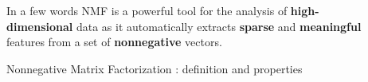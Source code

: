 \documentclass[final]{beamer}
\newlength{\sepwid}
\newlength{\onecolwid}
\newlength{\twocolwid}
\newlength{\threecolwid}
\begin{document}
\begin{frame}
\begin{columns}[t]
\begin{column}{\threecolwid}
\begin{columns}[t]
\begin{column}{\onecolwid}
\begin{exampleblock}{In a few words}
NMF is a powerful tool for the analysis of \textbf{high-dimensional} data as it automatically extracts \textbf{sparse} and \textbf{meaningful} features from a set of \textbf{nonnegative} vectors.
\end{exampleblock}


\begin{exampleblock}{Nonnegative Matrix Factorization : definition and properties}

\end{exampleblock}

\end{column} %

\begin{column}{\sepwid}\end{column} %

\begin{column}{\twocolwid} %



\end{column}
\end{columns}
\end{column}
\end{columns}
\end{frame}
\end{document}
